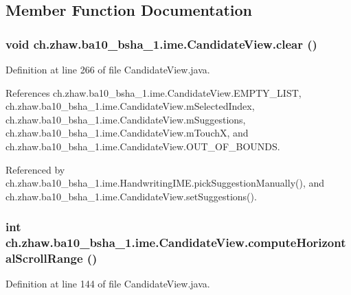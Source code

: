 \subsection{Member Function Documentation}
\hypertarget{classch_1_1zhaw_1_1ba10__bsha__1_1_1ime_1_1CandidateView_aa3d1a8c9206e423a3f532ef599b28cf4}{
\subsubsection[{clear}]{\setlength{\rightskip}{0pt plus 5cm}void ch.zhaw.ba10\_\-bsha\_\-1.ime.CandidateView.clear ()}}
\label{classch_1_1zhaw_1_1ba10__bsha__1_1_1ime_1_1CandidateView_aa3d1a8c9206e423a3f532ef599b28cf4}


Definition at line 266 of file CandidateView.java.

References ch.zhaw.ba10\_\-bsha\_\-1.ime.CandidateView.EMPTY\_\-LIST, ch.zhaw.ba10\_\-bsha\_\-1.ime.CandidateView.mSelectedIndex, ch.zhaw.ba10\_\-bsha\_\-1.ime.CandidateView.mSuggestions, ch.zhaw.ba10\_\-bsha\_\-1.ime.CandidateView.mTouchX, and ch.zhaw.ba10\_\-bsha\_\-1.ime.CandidateView.OUT\_\-OF\_\-BOUNDS.

Referenced by ch.zhaw.ba10\_\-bsha\_\-1.ime.HandwritingIME.pickSuggestionManually(), and ch.zhaw.ba10\_\-bsha\_\-1.ime.CandidateView.setSuggestions().\hypertarget{classch_1_1zhaw_1_1ba10__bsha__1_1_1ime_1_1CandidateView_a5e65e7d039376a5131044211f3affb37}{
\subsubsection[{computeHorizontalScrollRange}]{\setlength{\rightskip}{0pt plus 5cm}int ch.zhaw.ba10\_\-bsha\_\-1.ime.CandidateView.computeHorizontalScrollRange ()}}
\label{classch_1_1zhaw_1_1ba10__bsha__1_1_1ime_1_1CandidateView_a5e65e7d039376a5131044211f3affb37}


Definition at line 144 of file CandidateView.java.

